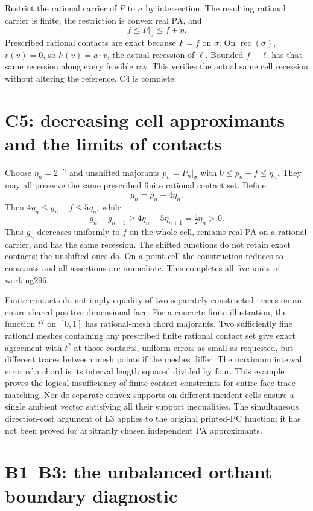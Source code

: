 \documentclass[
  11pt,
]{article}
\begin{document}
Restrict the rational carrier of \(P\) to \(\sigma\) by intersection.
The resulting rational carrier is finite, the restriction is convex real
PA, and \[ f\leq P|_\sigma\leq f+\eta. \] Prescribed rational contacts
are exact because \(F=f\) on \(\sigma\). On
\(\operatorname{rec}(\sigma)\), \(r(v)=0\), so \(h(v)=a\cdot v\), the
actual recession of \(\ell\). Bounded \(f-\ell\) has that same recession
along every feasible ray. This verifies the actual same cell recession
without altering the reference. C4 is complete.

\section{C5: decreasing cell approximants and the limits of
contacts}\label{c5-decreasing-cell-approximants-and-the-limits-of-contacts}

Choose \(\eta_n=2^{-n}\) and unshifted majorants \(p_n=P_n|_\sigma\)
with \(0\leq p_n-f\leq\eta_n\). They may all preserve the same
prescribed finite rational contact set. Define \[ g_n=p_n+4\eta_n. \]
Then \(4\eta_n\leq g_n-f\leq5\eta_n\), while
\[ g_n-g_{n+1}\geq4\eta_n-5\eta_{n+1}=\tfrac32\eta_n>0. \] Thus \(g_n\)
decreases uniformly to \(f\) on the whole cell, remains real PA on a
rational carrier, and has the same recession. The shifted functions do
not retain exact contacts; the unshifted ones do. On a point cell the
construction reduces to constants and all assertions are immediate. This
completes all five units of working296.

Finite contacts do not imply equality of two separately constructed
traces on an entire shared positive-dimensional face. For a concrete
finite illustration, the function \(t^2\) on \([0,1]\) has rational-mesh
chord majorants. Two sufficiently fine rational meshes containing any
prescribed finite rational contact set give exact agreement with \(t^2\)
at those contacts, uniform errors as small as requested, but different
traces between mesh points if the meshes differ. The maximum interval
error of a chord is its interval length squared divided by four. This
example proves the logical insufficiency of finite contact constraints
for entire-face trace matching. Nor do separate convex supports on
different incident cells ensure a single ambient vector satisfying all
their support inequalities. The simultaneous direction-cost argument of
L3 applies to the original printed-PC function; it has not been proved
for arbitrarily chosen independent PA approximants.

\section{B1--B3: the unbalanced orthant boundary
diagnostic}\label{b1b3-the-unbalanced-orthant-boundary-diagnostic}
\end{document}
